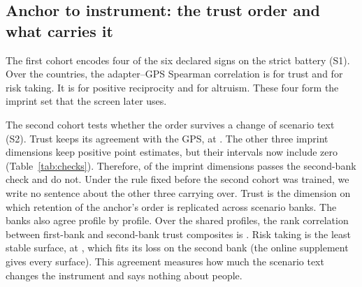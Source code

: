 \subsection{Anchor to instrument: the trust order and what carries it}\label{sec:res-bank}

The first cohort encodes four of the six declared signs on the strict battery (S1). Over the  countries, the adapter--GPS Spearman correlation is   for trust and   for risk taking. It is   for positive reciprocity and   for altruism. These four form the imprint set that the screen later uses.

The second cohort tests whether the order survives a change of scenario text (S2). Trust keeps its agreement with the GPS, at  . The other three imprint dimensions keep positive point estimates, but their intervals now include zero (Table~\ref{tab:checks}). Therefore,  of the  imprint dimensions passes the second-bank check and  do not. Under the rule fixed before the second cohort was trained, we write no sentence about the other three carrying over. Trust is the dimension on which retention of the anchor's order is replicated across scenario banks. The banks also agree profile by profile. Over the  shared profiles, the rank correlation between first-bank and second-bank trust composites is  . Risk taking is the least stable surface, at  , which fits its loss on the second bank (the online supplement gives every surface). This agreement measures how much the scenario text changes the instrument and says nothing about people.

